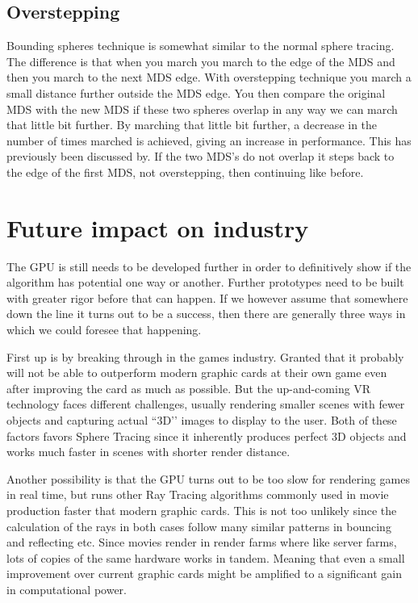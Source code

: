 		\subsection{Overstepping}

			Bounding spheres technique is somewhat similar to the normal sphere
			tracing. The difference is that when you march you march to the edge of
			the MDS and then you march to the next MDS edge. With overstepping
			technique you march a small distance further outside the MDS edge. You
			then compare the original MDS with the new MDS if these two spheres
			overlap in any way we can march that little bit further. By marching that
			little bit further, a decrease in the number of times marched is achieved,
			giving an increase in performance. This has previously been discussed
			by\cite{Korndorfer2014}. If the two MDS's do not overlap it steps back to 
			the edge of the first MDS, not overstepping, then continuing like before.
			

		
			
			

	\section{Future impact on industry} 

		The GPU is still needs to be developed further in order to definitively
		show if the algorithm has potential one way or another. Further prototypes
		need to be built with greater rigor before that can happen. If we however
		assume that somewhere down the line it turns out to be a success, then
		there are generally three ways in which we could foresee that happening.
		
		First up is by breaking through in the games industry. Granted that
		it probably will not be able to outperform modern graphic cards at
		their own game even after improving the card as much as possible. But
		the up-and-coming VR technology faces different challenges, usually
		rendering smaller scenes with fewer objects and capturing actual
		``3D’’ images to display to the user. Both of these factors favors
		Sphere Tracing since it inherently produces perfect 3D objects and
		works much faster in scenes with shorter render distance.
		
		Another possibility is that the GPU turns out to be too slow for
		rendering games in real time, but runs other Ray Tracing algorithms
		commonly used in movie production faster that modern graphic cards.
		This is not too unlikely since the calculation of the rays in both
		cases follow many similar patterns in bouncing and reflecting etc.
		Since movies render in render farms where like server farms, lots of
		copies of the same hardware works in tandem. Meaning that even a
		small improvement over current graphic cards might be amplified to a
		significant gain in computational power.
		
